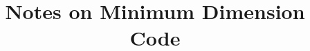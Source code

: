 \documentclass[12pt]{article}
\begin{document}
\title{Notes on Minimum Dimension Code}
\maketitle

\tableofcontents





\end{document}

